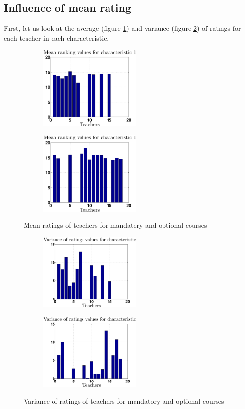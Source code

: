 \documentclass[12pt,a4paper]{article}
\begin{document}
\subsection*{Influence of mean rating}
First, let us look at the average (figure \ref{mean1}) and variance (figure \ref{var1}) of ratings for each teacher in each characteristic.
\begin{figure}[h!]
\centering
\begin{subfigure}[b]{0.49\textwidth}
\includegraphics[width = 5cm]{noPreprocess/meanTeachersC1.eps}
\end{subfigure}
\begin{subfigure}[b]{0.49\textwidth}
\includegraphics[width = 5cm]{noPreprocess/meanTeachersC2.eps}
\end{subfigure}
\caption{Mean ratings of teachers for mandatory and optional courses\label{mean1}}
\end{figure}
\begin{figure}[h!]
\centering
\begin{subfigure}[b]{0.49\textwidth}
\includegraphics[width = 5cm]{noPreprocess/varTeachersC1.eps}
\end{subfigure}
\begin{subfigure}[b]{0.49\textwidth}
\includegraphics[width = 5cm]{noPreprocess/varTeachersC2.eps}
\end{subfigure}
\caption{Variance of ratings of teachers for mandatory and optional courses\label{var1}}
\end{figure}
\end{document}
